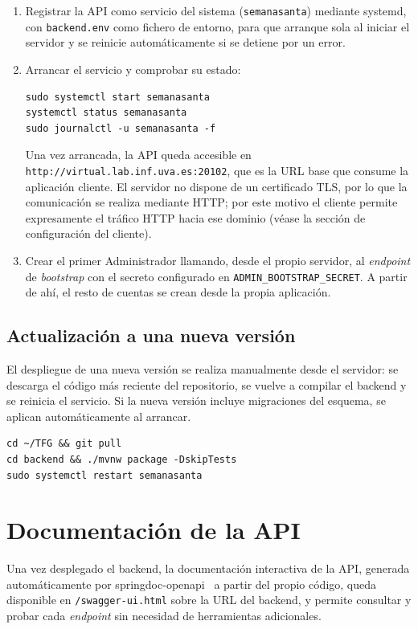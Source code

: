 \begin{enumerate}
    \item Registrar la API como servicio del sistema (\texttt{semanasanta}) mediante systemd, con \texttt{backend.env} como fichero de entorno, para que arranque sola al iniciar el servidor y se reinicie automáticamente si se detiene por un error.
    \item Arrancar el servicio y comprobar su estado:
    \begin{verbatim}
sudo systemctl start semanasanta
systemctl status semanasanta
sudo journalctl -u semanasanta -f
    \end{verbatim}
    Una vez arrancada, la API queda accesible en \texttt{http://virtual.lab.inf.uva.es:20102}, que es la URL base que consume la aplicación cliente. El servidor no dispone de un certificado TLS, por lo que la comunicación se realiza mediante HTTP; por este motivo el cliente permite expresamente el tráfico HTTP hacia ese dominio (véase la sección de configuración del cliente).
    \item Crear el primer Administrador llamando, desde el propio servidor, al \emph{endpoint} de \emph{bootstrap} con el secreto configurado en \texttt{ADMIN\_BOOTSTRAP\_SECRET}. A partir de ahí, el resto de cuentas se crean desde la propia aplicación.
\end{enumerate}

\subsection{Actualización a una nueva versión}

El despliegue de una nueva versión se realiza manualmente desde el servidor: se descarga el código más reciente del repositorio, se vuelve a compilar el backend y se reinicia el servicio. Si la nueva versión incluye migraciones del esquema, se aplican automáticamente al arrancar.
\begin{verbatim}
cd ~/TFG && git pull
cd backend && ./mvnw package -DskipTests
sudo systemctl restart semanasanta
\end{verbatim}

\section{Documentación de la API}

Una vez desplegado el backend, la documentación interactiva de la API, generada automáticamente por springdoc-openapi~\cite{springdoc} a partir del propio código, queda disponible en \texttt{/swagger-ui.html} sobre la URL del backend, y permite consultar y probar cada \emph{endpoint} sin necesidad de herramientas adicionales.

